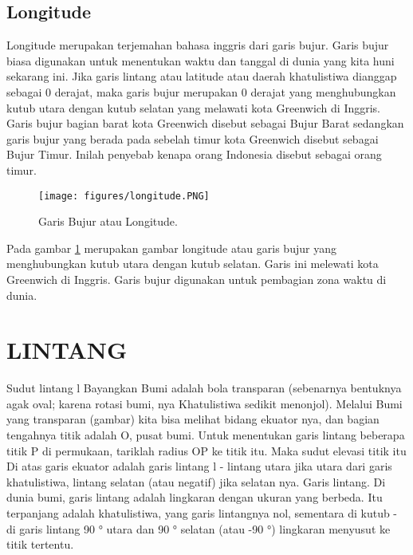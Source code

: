 \subsection{Longitude}
Longitude merupakan terjemahan bahasa inggris dari garis bujur. Garis bujur biasa digunakan untuk menentukan waktu dan tanggal di dunia yang kita huni sekarang ini. Jika garis lintang atau latitude atau daerah khatulistiwa dianggap sebagai 0 derajat, maka garis bujur merupakan 0 derajat yang menghubungkan kutub utara dengan kutub selatan yang melawati kota Greenwich di Inggris. Garis bujur bagian barat kota Greenwich disebut sebagai Bujur Barat sedangkan garis bujur yang berada pada sebelah timur kota Greenwich disebut sebagai Bujur Timur. Inilah penyebab kenapa orang Indonesia disebut sebagai orang timur.
	\begin{figure}[ht]
	\centerline{\texttt{[image: figures/longitude.PNG]}}
	\caption{Garis Bujur atau Longitude.}
	\label{longitude}
	\end{figure}
Pada gambar \ref{longitude} merupakan gambar longitude atau garis bujur yang menghubungkan kutub utara dengan kutub selatan. Garis ini melewati kota Greenwich di Inggris.
Garis bujur digunakan untuk pembagian zona waktu di dunia.

\section{LINTANG}

	Sudut lintang l
	Bayangkan Bumi adalah bola transparan (sebenarnya
	bentuknya agak oval; karena rotasi bumi, nya
	Khatulistiwa sedikit menonjol). Melalui Bumi yang transparan
	(gambar) kita bisa melihat bidang ekuator nya, dan bagian tengahnya
	titik adalah O, pusat bumi.
	Untuk menentukan garis lintang beberapa titik P di permukaan, tariklah
	radius OP ke titik itu. Maka sudut elevasi titik itu
	Di atas garis ekuator adalah garis lintang l - lintang utara jika utara
	dari garis khatulistiwa, lintang selatan (atau negatif) jika selatan nya.
	Garis lintang. Di dunia bumi, garis lintang adalah lingkaran dengan ukuran yang berbeda. Itu
	terpanjang adalah khatulistiwa, yang garis lintangnya nol, sementara di kutub - di garis lintang
	90 ° utara dan 90 ° selatan (atau -90 °) lingkaran menyusut ke titik tertentu.

